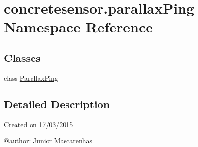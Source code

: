 \hypertarget{namespaceconcretesensor_1_1parallaxPing}{}\section{concretesensor.\+parallax\+Ping Namespace Reference}
\label{namespaceconcretesensor_1_1parallaxPing}
\subsection*{Classes}
\begin{DoxyCompactItemize}
\item 
class \hyperlink{classconcretesensor_1_1parallaxPing_1_1ParallaxPing}{Parallax\+Ping}
\end{DoxyCompactItemize}


\subsection{Detailed Description}
\begin{DoxyVerb}Created on 17/03/2015

@author: Junior Mascarenhas
\end{DoxyVerb}
 